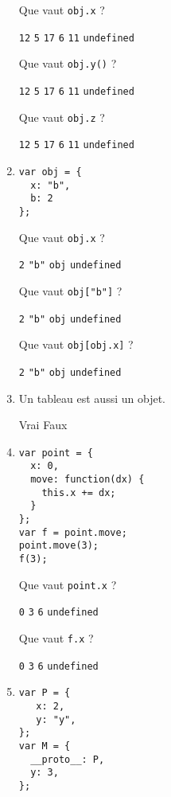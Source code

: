 \documentclass[a4paper, 12pt]{article}
\newcommand{\choice}[1]{\Square\hspace{2pt} #1\hspace{5pt}}
\newcommand{\choicec}[1]{\Square\hspace{2pt} \lstinline{#1}\hspace{5pt}}
\begin{document}
\begin{enumerate}
  Que vaut \lstinline{obj.x} ?

  \choicec{12} \choicec{5} \choicec{17} \choicec{6} \choicec{11} \choicec{undefined}

  Que vaut \lstinline{obj.y()} ?

  \choicec{12} \choicec{5} \choicec{17} \choicec{6} \choicec{11} \choicec{undefined}

  Que vaut \lstinline{obj.z} ?

  \choicec{12} \choicec{5} \choicec{17} \choicec{6} \choicec{11} \choicec{undefined}
\item \lstset{language=javascript}
\begin{lstlisting}
var obj = {
  x: "b",
  b: 2
};
\end{lstlisting}

  Que vaut \lstinline{obj.x} ?

  \choicec{2} \choicec{"b"} \choicec{obj} \choicec{undefined}

  Que vaut \lstinline{obj["b"]} ?

  \choicec{2} \choicec{"b"} \choicec{obj} \choicec{undefined}

  Que vaut \lstinline{obj[obj.x]} ?

  \choicec{2} \choicec{"b"} \choicec{obj} \choicec{undefined}
\item Un tableau est aussi un objet.

   \choice{Vrai} \choice{Faux}
\item \lstset{language=javascript}
\begin{lstlisting}
var point = {
  x: 0,
  move: function(dx) {
    this.x += dx;
  }
};
var f = point.move;
point.move(3);
f(3);
\end{lstlisting}



  Que vaut \lstinline{point.x} ?

  \choicec{0} \choicec{3} \choicec{6} \choicec{undefined}

  Que vaut \lstinline{f.x} ?

  \choicec{0} \choicec{3} \choicec{6} \choicec{undefined}
\item \lstset{language=javascript}
\begin{lstlisting}
var P = {
   x: 2,
   y: "y",
};
var M = {
  __proto__: P,
  y: 3,
};
\end{lstlisting}


\end{enumerate}
\end{document}
